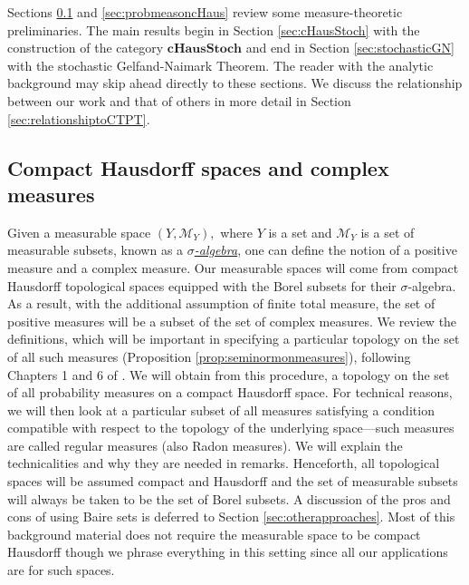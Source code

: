 \documentclass[12pt]{article}
\edef\t{\pgfmathresult}%
\theoremstyle{theorem}
\theoremstyle{definition}
\numberwithin{equation}{section}
\let\s=\sigma \let\t=\tau \let\u=\upsilon \let\f=\phi \let\c=\chi
\newcommand{\<}{\langle}
\renewcommand{\>}{\rangle}
\newcommand{\cHStoch}{\mathbf{cHausStoch}}
\begin{document}
Sections \ref{sec:chausmeasures} and \ref{sec:probmeasoncHaus} 
review some measure-theoretic preliminaries. 
The main results begin in
Section \ref{sec:cHausStoch} with the construction
of the category $\cHStoch$ and end in 
Section \ref{sec:stochasticGN} with the stochastic Gelfand-Naimark Theorem.
The reader with the analytic background may skip ahead directly to these sections.
We discuss the relationship between our work and that of others
in more detail in Section \ref{sec:relationshiptoCTPT}. 

\subsection{Compact Hausdorff spaces and complex measures}
\label{sec:chausmeasures}

Given a measurable space $(Y,\mathcal{M}_{Y}),$ where $Y$ is a set
and $\mathcal{M}_{Y}$ is a set of measurable subsets, 
known as a \emph{\uline{$\s$-algebra}},
one can define the notion of a positive measure and a 
complex measure. 
Our measurable
spaces will come from compact Hausdorff topological spaces 
equipped with the Borel subsets for their $\s$-algebra.  
As a result, with the additional assumption of finite total measure, 
the set of positive measures will be a 
subset of the set of complex measures. We review the definitions, 
which will be important in specifying a particular topology on the set
of all such measures (Proposition \ref{prop:seminormonmeasures}), 
following Chapters 1 and 6 of \cite{Ru87}. 
We will obtain from this procedure, a 
topology on the set of all probability measures on a compact Hausdorff space. 
For technical reasons, we will then look at a particular subset of all 
measures satisfying a condition compatible with respect to the topology of the
underlying space---such measures are called regular measures 
(also Radon measures). 
We will explain the technicalities and why they are needed in remarks. 
Henceforth, all topological spaces will be assumed compact and Hausdorff
and the set of measurable subsets will always be taken to be 
the set of Borel subsets.
A discussion of the pros and cons of using Baire sets is deferred to 
Section \ref{sec:otherapproaches}.
Most of this background material does not require the measurable
space to be compact Hausdorff though we phrase everything in this 
setting since all our applications are for such spaces. 
\end{document}
